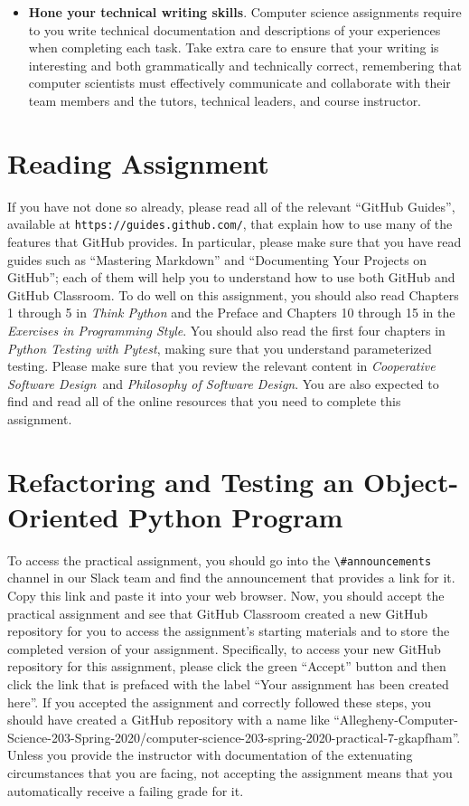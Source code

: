 \documentclass[11pt]{article}
\newcommand{\cooperative}{{\em Cooperative Software Design\/}}
\newcommand{\philosophy}{{\em Philosophy of Software Design\/}}
\newcommand{\pytest}{{\em Python Testing with Pytest\/}}
\newcommand{\url}[1]{\lstinline{#1}}
\newcommand{\channel}[1]{\lstinline{#1}}
\begin{document}
\begin{itemize}
\item {\bf Hone your technical writing skills}. Computer science assignments
  require to you write technical documentation and descriptions of your
  experiences when completing each task. Take extra care to ensure that your
  writing is interesting and both grammatically and technically correct,
  remembering that computer scientists must effectively communicate and
  collaborate with their team members and the tutors, technical leaders, and
  course instructor.

\end{itemize}

\section*{Reading Assignment}

If you have not done so already, please read all of the relevant ``GitHub
Guides'', available at \url{https://guides.github.com/}, that explain how to use
many of the features that GitHub provides. In particular, please make sure that
you have read guides such as ``Mastering Markdown'' and ``Documenting Your
Projects on GitHub''; each of them will help you to understand how to use both
GitHub and GitHub Classroom. To do well on this assignment, you should also read
Chapters 1 through 5 in {\em Think Python\/} and the Preface and Chapters 10
through 15 in the {\em Exercises in Programming Style\/}.
%
You should also read the first four chapters in \pytest, making sure that you
understand parameterized testing.
%
Please make sure that you review the relevant content in \cooperative~and
\philosophy.
%
You are also expected to find and read all of the online resources that you need
to complete this assignment.

\section*{Refactoring and Testing an Object-Oriented Python Program}

To access the practical assignment, you should go into the
\channel{\#announcements} channel in our Slack team and find the announcement
that provides a link for it. Copy this link and paste it into your web browser.
Now, you should accept the practical assignment and see that GitHub Classroom
created a new GitHub repository for you to access the assignment's starting
materials and to store the completed version of your assignment. Specifically,
to access your new GitHub repository for this assignment, please click the green
``Accept'' button and then click the link that is prefaced with the label ``Your
assignment has been created here''. If you accepted the assignment and correctly
followed these steps, you should have created a GitHub repository with a name
like
``Allegheny-Computer-Science-203-Spring-2020/computer-science-203-spring-2020-practical-7-gkapfham''.
Unless you provide the instructor with documentation of the extenuating
circumstances that you are facing, not accepting the assignment means that you
automatically receive a failing grade for it.
\end{document}
